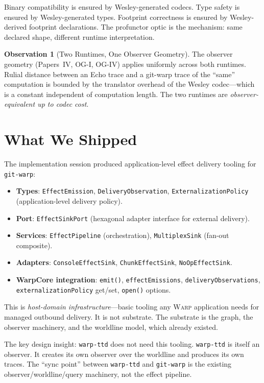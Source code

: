 \documentclass[11pt]{article}
\newcommand{\WARP}{\textsc{Warp}}
\theoremstyle{definition}
\newtheorem{observation}{Observation}
\begin{document}
Binary compatibility is ensured by Wesley-generated codecs. Type
safety is ensured by Wesley-generated types. Footprint correctness
is ensured by Wesley-derived footprint declarations. The profunctor
optic is the mechanism: same declared shape, different runtime
interpretation.

\begin{observation}[Two Runtimes, One Observer Geometry]
The observer geometry (Papers~IV, OG-I, OG-IV) applies uniformly
across both runtimes. Rulial distance between an Echo trace and a
git-warp trace of the ``same'' computation is bounded by the
translator overhead of the Wesley codec---which is a constant
independent of computation length. The two runtimes are
\emph{observer-equivalent up to codec cost}.
\end{observation}

\section{What We Shipped}

The implementation session produced application-level effect delivery
tooling for \texttt{git-warp}:

\begin{itemize}[leftmargin=2em]
\item \textbf{Types}: \texttt{EffectEmission}, \texttt{DeliveryObservation},
  \texttt{ExternalizationPolicy} (application-level delivery policy).
\item \textbf{Port}: \texttt{EffectSinkPort} (hexagonal adapter interface
  for external delivery).
\item \textbf{Services}: \texttt{EffectPipeline} (orchestration),
  \texttt{MultiplexSink} (fan-out composite).
\item \textbf{Adapters}: \texttt{ConsoleEffectSink},
  \texttt{ChunkEffectSink}, \texttt{NoOpEffectSink}.
\item \textbf{WarpCore integration}: \texttt{emit()},
  \texttt{effectEmissions}, \texttt{deliveryObservations},
  \texttt{externalizationPolicy} get/set, \texttt{open()} options.
\end{itemize}

This is \emph{host-domain infrastructure}---basic tooling any \WARP{}
application needs for managed outbound delivery. It is not substrate.
The substrate is the graph, the observer machinery, and the worldline
model, which already existed.

The key design insight: \texttt{warp-ttd} does not need this tooling.
\texttt{warp-ttd} is itself an observer. It creates its own observer
over the worldline and produces its own traces. The ``sync point''
between \texttt{warp-ttd} and \texttt{git-warp} is the existing
observer/worldline/query machinery, not the effect pipeline.
\end{document}
